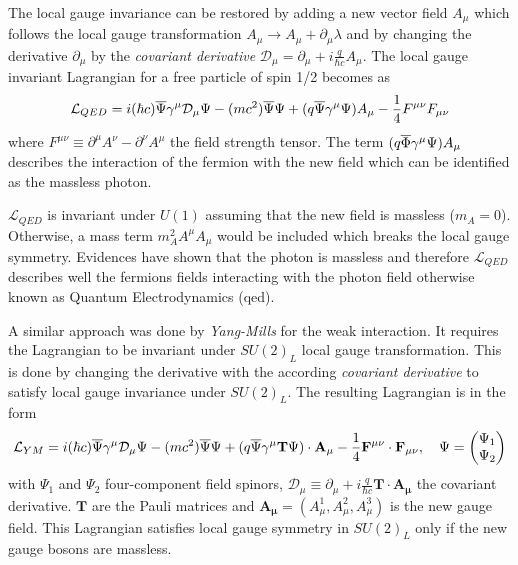 The local gauge invariance can be restored by adding a new vector field $A_{\mu}$ which follows the local gauge transformation $A_{\mu} \rightarrow A_{\mu} + \partial_{\mu}\lambda$ and by changing the derivative $\partial_{\mu}$ by the \textit{covariant derivative} $\mathcal{D}_{\mu} = \partial_{\mu} + i\frac{q}{\hbar c}A_{\mu}$. The local gauge invariant Lagrangian for a free particle of spin 1/2 becomes as \cite{Griffiths:343277}
\begin{equation}
  \mathcal{L}_{QED} = i(\hbar c)\overline{\rm \Psi}\gamma^{\mu}\mathcal{D}_{\mu}\Psi - (mc^2)\overline{\rm \Psi}\Psi + (q\overline{\rm \Psi}\gamma^{\mu}\Psi)A_{\mu} - \frac{1}{4}F^{\mu\nu}F_{\mu\nu}
\end{equation}
where $F^{\mu\nu} \equiv \partial^{\mu}A^{\nu} - \partial^{\nu}A^{\mu}$ the field strength tensor. The term $(q\overline{\rm \Phi}\gamma^{\mu}\Psi)A_{\mu}$ describes the interaction of the fermion with the new field which can be identified as the massless photon.

$\mathcal{L}_{QED}$ is invariant under $U(1)$ assuming that the new field is massless ($m_{A} = 0$). Otherwise, a mass term $m_{A}^2A^{\mu}A_{\mu}$ would be included which breaks the local gauge symmetry. Evidences \cite{Lakes:1998mi, Chibisov:1976mm, Williams:1971ms} have shown that the photon is massless and therefore $\mathcal{L}_{QED}$ describes well the fermions fields interacting with the photon field otherwise known as Quantum Electrodynamics (\acrshort{qed}).

A similar approach was done by \textit{Yang-Mills} for the weak interaction. It requires the Lagrangian to be invariant under $SU(2)_{L}$ local gauge transformation. This is done by changing the derivative with the according \textit{covariant derivative} to satisfy local gauge invariance under $SU(2)_{L}$. The resulting Lagrangian is in the form \cite{Griffiths:343277}
\begin{equation}
  \mathcal{L}_{YM} = i(\hbar c)\overline{\rm \Psi}\gamma^{\mu}\mathcal{D}_{\mu}\Psi - (mc^2)\overline{\rm \Psi}\Psi + (q\overline{\rm \Psi}\gamma^{\mu}\mathbf{T}\Psi) \cdot \mathbf{A_{\mu}} - \frac{1}{4}\mathbf{F^{\mu\nu}} \cdot \mathbf{F_{\mu\nu}}, \quad \Psi = \begin{pmatrix} \Psi_1 \\ \Psi_2 \end{pmatrix}
\end{equation}
with $\Psi_1$ and $\Psi_2$ four-component field spinors, $\mathcal{D}_{\mu} \equiv \partial_{\mu} + i\frac{q}{\hbar c}\mathbf{T} \cdot \mathbf{A_{\mu}}$ the covariant derivative. $\mathbf{T}$ are the Pauli matrices and $\mathbf{A_{\mu}} = (A_{\mu}^1, A_{\mu}^2, A_{\mu}^3)$ is the new gauge field. This Lagrangian satisfies local gauge symmetry in $SU(2)_{L}$ only if the new gauge bosons are massless.

